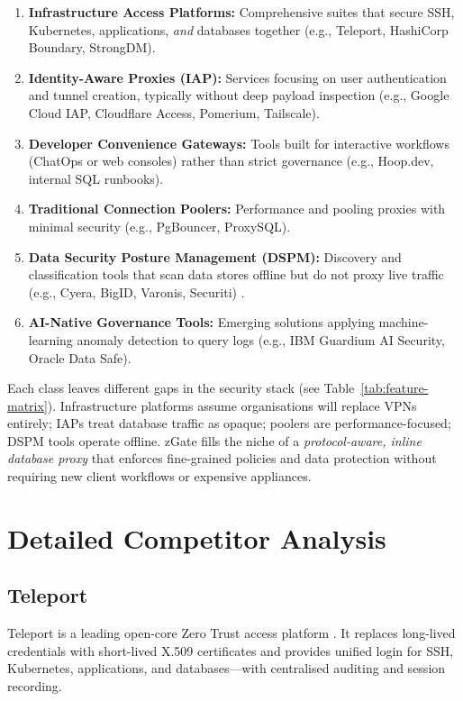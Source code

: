 \begin{enumerate}
  \item \textbf{Infrastructure Access Platforms:} Comprehensive suites that secure SSH, Kubernetes, applications, \emph{and} databases together (e.g., Teleport, HashiCorp Boundary, StrongDM).
  \item \textbf{Identity-Aware Proxies (IAP):} Services focusing on user authentication and tunnel creation, typically without deep payload inspection (e.g., Google Cloud IAP, Cloudflare Access, Pomerium, Tailscale).
  \item \textbf{Developer Convenience Gateways:} Tools built for interactive workflows (ChatOps or web consoles) rather than strict governance (e.g., Hoop.dev, internal SQL runbooks).
  \item \textbf{Traditional Connection Poolers:} Performance and pooling proxies with minimal security (e.g., PgBouncer, ProxySQL).
  \item \textbf{Data Security Posture Management (DSPM):} Discovery and classification tools that scan data stores offline but do not proxy live traffic (e.g., Cyera, BigID, Varonis, Securiti) \cite{paloalto-dspm}.
  \item \textbf{AI-Native Governance Tools:} Emerging solutions applying machine-learning anomaly detection to query logs (e.g., IBM Guardium AI Security, Oracle Data Safe).
\end{enumerate}

Each class leaves different gaps in the security stack (see Table~\ref{tab:feature-matrix}). Infrastructure platforms assume organisations will replace VPNs entirely; IAPs treat database traffic as opaque; poolers are performance-focused; DSPM tools operate offline. zGate fills the niche of a \emph{protocol-aware, inline database proxy} that enforces fine-grained policies and data protection without requiring new client workflows or expensive appliances.

\section{Detailed Competitor Analysis}

\subsection{Teleport}

Teleport is a leading open-core Zero Trust access platform \cite{teleport}. It replaces long-lived credentials with short-lived X.509 certificates and provides unified login for SSH, Kubernetes, applications, and databases---with centralised auditing and session recording.

